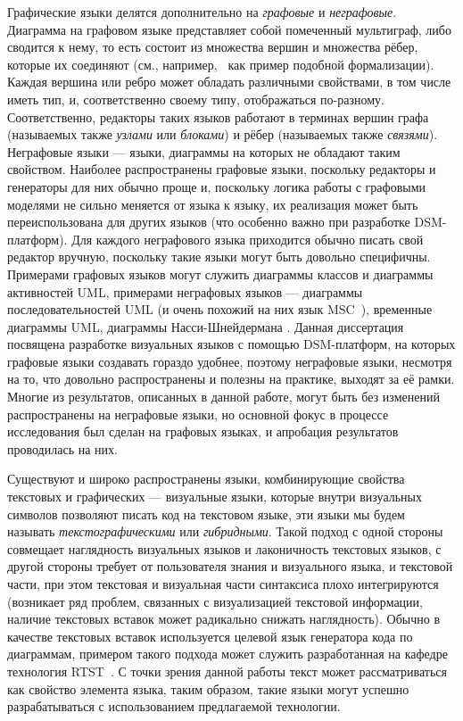 Графические языки делятся дополнительно на \textit{графовые} и \textit{неграфовые}. Диаграмма на 
графовом языке представляет собой помеченный мультиграф, либо сводится к нему, то 
есть состоит из множества вершин и множества рёбер, которые их соединяют (см., например,~\cite{sukhov2013disser}
как пример подобной формализации). Каждая вершина или ребро может обладать различными свойствами, в том числе иметь 
тип, и, соответственно своему типу, отображаться по-разному. Соответственно,
 редакторы таких языков работают в терминах вершин графа (называемых также 
\textit{узлами} или \textit{блоками}) и рёбер (называемых также \textit{связями}). Неграфовые языки --- 
языки, диаграммы на которых не обладают таким свойством. Наиболее распространены 
графовые языки, поскольку редакторы и генераторы для них обычно проще и, 
поскольку логика работы с графовыми моделями не сильно меняется от языка к 
языку, их реализация может быть переиспользована для других языков (что особенно 
важно при разработке DSM-платформ). Для каждого неграфового языка приходится 
обычно писать свой редактор вручную, поскольку такие языки могут быть довольно 
специфичны. Примерами графовых языков могут служить диаграммы классов и 
диаграммы активностей \ac{UML}, примерами неграфовых языков --- диаграммы 
последовательностей \ac{UML} (и очень похожий на них язык MSC~\cite{mauw1996formalization}), 
временные диаграммы \ac{UML}, диаграммы Насси-Шнейдермана%
. Данная диссертация посвящена разработке визуальных языков с помощью 
DSM-платформ, на которых графовые языки создавать гораздо удобнее, поэтому 
неграфовые языки, несмотря на то, что довольно распространены и полезны на 
практике, выходят за её рамки. Многие из результатов, описанных в данной работе, могут 
быть без изменений распространены на неграфовые языки, но основной фокус в процессе 
исследования был сделан на графовых языках, и апробация результатов проводилась на них.

Существуют и широко распространены языки, комбинирующие свойства текстовых и 
графических --- визуальные языки, которые внутри визуальных символов позволяют 
писать код на текстовом языке, эти языки мы будем называть \textit{текстографическими} или \textit{гибридными}. 
Такой подход с одной стороны совмещает наглядность визуальных языков и лаконичность текстовых языков, с другой стороны 
требует от пользователя знания и визуального языка, и текстовой части, при этом 
текстовая и визуальная части синтаксиса плохо интегрируются (возникает ряд 
проблем, связанных с визуализацией текстовой информации, наличие текстовых
вставок может радикально снижать наглядность). Обычно в качестве текстовых 
вставок используется целевой язык генератора кода по диаграммам, примером такого 
подхода может служить разработанная на кафедре технология RTST~\cite{parfenov1997rtst, terekhov1998rtst}. 
С точки зрения данной работы текст может рассматриваться как свойство элемента 
языка, таким образом, такие языки могут успешно разрабатываться с использованием 
предлагаемой технологии.

